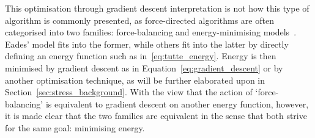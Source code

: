 This optimisation through gradient descent interpretation is not how this type of algorithm is commonly presented, as  force-directed algorithms are often categorised into two families: force-balancing and energy-minimising models~\cite{ortmann, brandes_physical}.
Eades' model fits into the former, while others fit into the latter by directly defining an energy function such as in~\eqref{eq:tutte_energy}.
Energy is then minimised by gradient descent as in Equation~\eqref{eq:gradient_descent} or by another optimisation technique, as will be further elaborated upon in Section~\ref{sec:stress_background}.
With the view that the action of `force-balancing' is equivalent to gradient descent on another energy function, however, it is made clear that the two families are equivalent in the sense that both strive for the same goal: minimising energy.

